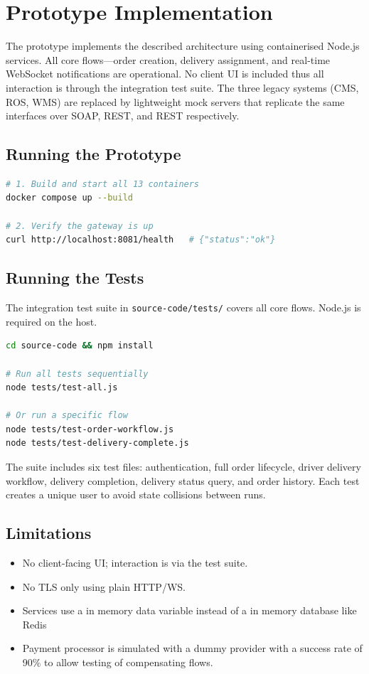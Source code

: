\section{Prototype Implementation}
\label{sec:prototype}

The prototype implements the described architecture using containerised Node.js services. All core flows—order creation, delivery assignment, and real-time WebSocket notifications are operational. No client UI is included thus all interaction is through the integration test suite. The three legacy systems (CMS, ROS, WMS) are replaced by lightweight mock servers that replicate the same interfaces over SOAP, REST, and REST respectively.

\subsection{Running the Prototype}
\label{subsec:setup}

\begin{lstlisting}[language=bash]
# 1. Build and start all 13 containers
docker compose up --build

# 2. Verify the gateway is up
curl http://localhost:8081/health   # {"status":"ok"}
\end{lstlisting}

\subsection{Running the Tests}
\label{subsec:testing}

The integration test suite in \texttt{source-code/tests/} covers all core flows. Node.js is required on the host.

\begin{lstlisting}[language=bash]
cd source-code && npm install

# Run all tests sequentially
node tests/test-all.js

# Or run a specific flow
node tests/test-order-workflow.js
node tests/test-delivery-complete.js
\end{lstlisting}

The suite includes six test files: authentication, full order lifecycle, driver delivery workflow, delivery completion, delivery status query, and order history. Each test creates a unique user to avoid state collisions between runs.

\subsection{Limitations}
\label{subsec:limitations}

\begin{itemize}
    \item No client-facing UI; interaction is via the test suite. 
    \item No TLS only using plain HTTP/WS.
    \item Services use a in memory data variable instead of a in memory database like Redis 
    \item Payment processor is simulated with a dummy provider with a success rate of 90\% to allow testing of compensating flows.
\end{itemize}